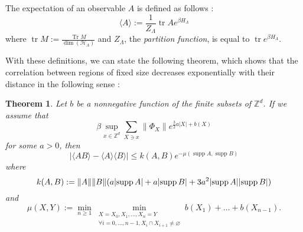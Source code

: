 \documentclass[french]{article}
\DeclarePairedDelimiter\abs{\lvert}{\rvert}
\newtheorem{thm}{Theorem}
\DeclareMathOperator{\Tr}{Tr}
\DeclareMathOperator{\tr}{tr}
\DeclareMathOperator{\supp}{supp}
\begin{document}
 The expectation of an observable $A$ is defined as follows :
 $$
 \langle A \rangle := \frac{1}{Z_\Lambda}\tr Ae^{\beta H_\Lambda}
 $$
 where $\tr M:=\frac{\Tr M}{\dim(\mathcal H_\Lambda)}$ and $Z_\Lambda$, the {\it partition function}, is equal to $\tr e^{\beta H_\Lambda}$.
 
 With these definitions, we can state the following theorem, which shows that the correlation between regions of fixed size decreases exponentially with their distance in the following sense :
 \begin{thm}
     Let $b$ be a nonnegative function of the finite subsets of $\mathbb Z^d$.
     If we assume that 
     $$\beta\sup_{x\in\mathbb Z^d}\sum_{X\ni x}\lVert\Phi_X\rVert e^{\frac{3}{2}a|X|+b(X)}$$ 
     for some $a>0$, then 
     $$|\langle AB\rangle - \langle A\rangle\langle B\rangle|\leq k(A,B)e^{-\mu(\supp A,\supp B)}$$
     where $$k(A,B):=\lVert A\rVert\lVert B\rVert(a\abs{\supp A}+a\abs{\supp B} + 3a^2\abs{\supp A}\abs{\supp B})$$ and 
     $$
     \mu(X,Y):= \min_{n\geq 1} \min_{\substack{X=X_0,X_1,\ldots,X_n=Y \\ \forall i=0,\ldots,n-1, X_i\cap X_{i+1}\neq \varnothing}} b(X_1)+\ldots+b(X_{n-1}).
     $$
 \end{thm}
\end{document}
